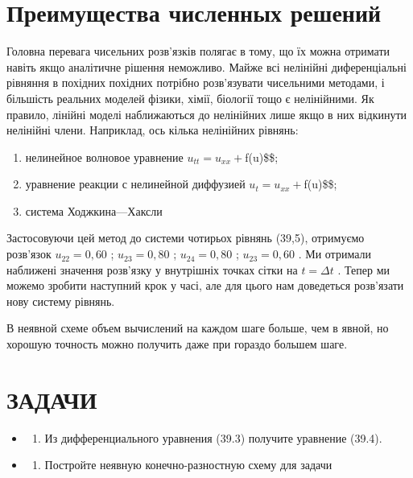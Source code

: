 \documentclass[
  ukrainian,
]{article}
\providecommand{\tightlist}{%
  \setlength{\itemsep}{0pt}\setlength{\parskip}{0pt}}
\begin{document}
\section{Преимущества численных
решений}\label{ux43fux440ux435ux438ux43cux443ux449ux435ux441ux442ux432ux430-ux447ux438ux441ux43bux435ux43dux43dux44bux445-ux440ux435ux448ux435ux43dux438ux439}

Головна перевага чисельних розв'язків полягає в тому, що їх можна
отримати навіть якщо аналітичне рішення неможливо. Майже всі нелінійні
диференціальні рівняння в похідних похідних потрібно розв'язувати
чисельними методами, і більшість реальних моделей фізики, хімії,
біології тощо є нелінійними. Як правило, лінійні моделі наближаються до
нелінійних лише якщо в них відкинути нелінійні члени. Наприклад, ось
кілька нелінійних рівнянь:

\begin{enumerate}
\def\labelenumi{\arabic{enumi})}
\item
  нелинейное волновое уравнение \(u_{tt} = u_{xx} +\)f(u)\$\$;
\item
  уравнение реакции с нелинейной диффузией \(u_t = u_{xx} +\)f(u)\$\$;
\item
  система Ходжкина---Хаксли
\end{enumerate}

Застосовуючи цей метод до системи чотирьох рівнянь (39,5), отримуємо
розв'язок \(u_{22}=0,60\) ; \(u_{23}=0,80\) ; \(u_{24}=0,80\) ;
\(u_{23}=0,60\) . Ми отримали наближені значення розв'язку у внутрішніх
точках сітки на \(t=\Delta t\) . Тепер ми можемо зробити наступний крок
у часі, але для цього нам доведеться розв'язати нову систему рівнянь.

В неявной схеме объем вычислений на каждом шаге больше, чем в явной, но
хорошую точность можно получить даже при гораздо большем шаге.

\section{ЗАДАЧИ}\label{ux437ux430ux434ux430ux447ux438-8}

\begin{itemize}
\tightlist
\item
  \begin{enumerate}
  \def\labelenumi{\arabic{enumi}.}
  \tightlist
  \item
    Из дифференциального уравнения (39.3) получите уравнение (39.4).
  \end{enumerate}
\item
  \begin{enumerate}
  \def\labelenumi{\arabic{enumi}.}
  \setcounter{enumi}{1}
  \tightlist
  \item
    Постройте неявную конечно-разностную схему для задачи
  \end{enumerate}
\end{itemize}
\end{document}
